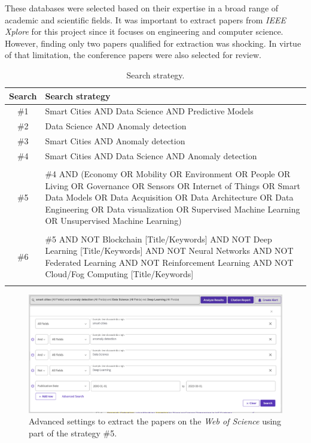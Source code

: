 \documentclass[a4paper,12pt,twoside]{ThesisStyle}
\begin{document}
These databases were selected based on their expertise in a broad range of academic and scientific fields. It was important to extract papers from \textit{IEEE Xplore} for this project since it focuses on engineering and computer science. However, finding only two papers qualified for extraction was shocking. In virtue of that limitation, the conference papers were also selected for review. 

\begin{table}[htb]
\centering
\begin{tabular}{  c  l   }
 \hline
  \textbf{Search} & \textbf{Search strategy} \\
\hline
 \#1 & \parbox{11.5cm}{Smart Cities AND Data Science AND Predictive Models}  \\
 \#2 & \parbox{11.5cm}{Data Science AND Anomaly detection}   \\
 \#3 & \parbox{11.5cm}{Smart Cities AND Anomaly detection}   \\
 \#4 & \parbox{11.5cm}{Smart Cities AND Data Science AND Anomaly detection}  \\
  \\
 \#5 & \parbox{11.5cm}{\#4 AND (Economy OR Mobility OR Environment OR People  OR  Living OR Governance OR Sensors OR Internet of Things OR Smart Data Models OR Data Acquisition OR Data Architecture OR Data Engineering OR Data visualization OR Supervised Machine Learning OR Unsupervised Machine Learning)}  \\
  \\
 \#6 & \parbox{11cm}{\#5 AND NOT Blockchain [Title/Keywords] AND NOT Deep Learning [Title/Keywords] AND NOT Neural Networks AND NOT Federated Learning AND NOT Reinforcement Learning AND NOT Cloud/Fog Computing [Title/Keywords]}  \\
 \\
  \hline
  \end{tabular}
\caption{Search strategy.}
\label{taula:SearchStrategy} 
\end{table}

\begin{figure}[htb]
\centering
\includegraphics[width=13 cm]{imatges/search_concepts.png}
\caption{\label{fig:search_concepts} Advanced settings to extract the papers on the \textit{Web of Science} using part of the strategy \#5.}
\end{figure}
\end{document}
